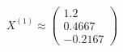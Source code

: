 \documentclass[preview]{standalone}
\begin{document}
\begin{align*}
X^{(1)} \approx \begin{pmatrix} 1.2 \\ 0.4667 \\ -0.2167 \end{pmatrix}
\end{align*}
\end{document}
